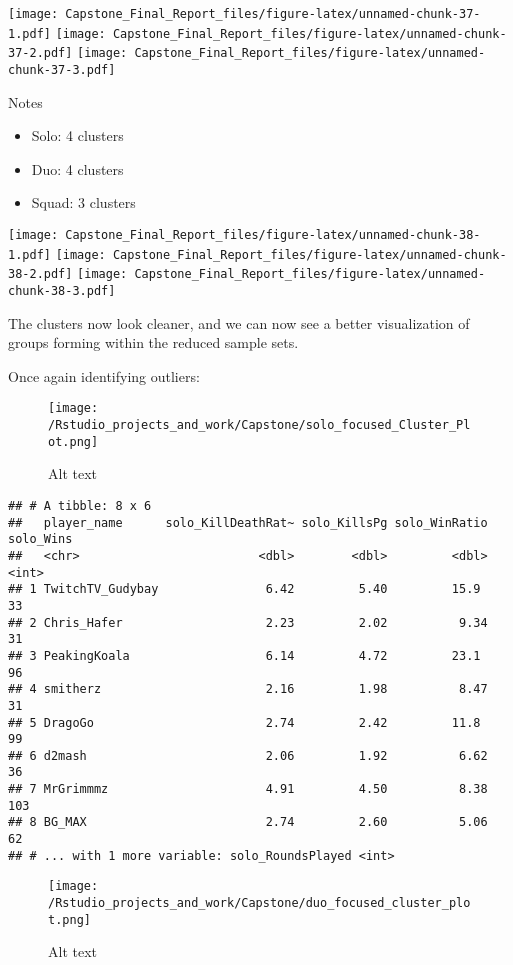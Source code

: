 \documentclass[]{article}
\providecommand{\tightlist}{%
  \setlength{\itemsep}{0pt}\setlength{\parskip}{0pt}}
\begin{document}
\texttt{[image: Capstone\_Final\_Report\_files/figure-latex/unnamed-chunk-37-1.pdf]}
\texttt{[image: Capstone\_Final\_Report\_files/figure-latex/unnamed-chunk-37-2.pdf]}
\texttt{[image: Capstone\_Final\_Report\_files/figure-latex/unnamed-chunk-37-3.pdf]}

Notes

\begin{itemize}
\tightlist
\item
  Solo: 4 clusters
\item
  Duo: 4 clusters
\item
  Squad: 3 clusters
\end{itemize}

\texttt{[image: Capstone\_Final\_Report\_files/figure-latex/unnamed-chunk-38-1.pdf]}
\texttt{[image: Capstone\_Final\_Report\_files/figure-latex/unnamed-chunk-38-2.pdf]}
\texttt{[image: Capstone\_Final\_Report\_files/figure-latex/unnamed-chunk-38-3.pdf]}

The clusters now look cleaner, and we can now see a better visualization
of groups forming within the reduced sample sets.

Once again identifying outliers:

\begin{figure}
\centering
\texttt{[image: /Rstudio\_projects\_and\_work/Capstone/solo\_focused\_Cluster\_Plot.png]}
\caption{Alt text}
\end{figure}

\begin{verbatim}
## # A tibble: 8 x 6
##   player_name      solo_KillDeathRat~ solo_KillsPg solo_WinRatio solo_Wins
##   <chr>                         <dbl>        <dbl>         <dbl>     <int>
## 1 TwitchTV_Gudybay               6.42         5.40         15.9         33
## 2 Chris_Hafer                    2.23         2.02          9.34        31
## 3 PeakingKoala                   6.14         4.72         23.1         96
## 4 smitherz                       2.16         1.98          8.47        31
## 5 DragoGo                        2.74         2.42         11.8         99
## 6 d2mash                         2.06         1.92          6.62        36
## 7 MrGrimmmz                      4.91         4.50          8.38       103
## 8 BG_MAX                         2.74         2.60          5.06        62
## # ... with 1 more variable: solo_RoundsPlayed <int>
\end{verbatim}

\begin{figure}
\centering
\texttt{[image: /Rstudio\_projects\_and\_work/Capstone/duo\_focused\_cluster\_plot.png]}
\caption{Alt text}
\end{figure}
\end{document}

